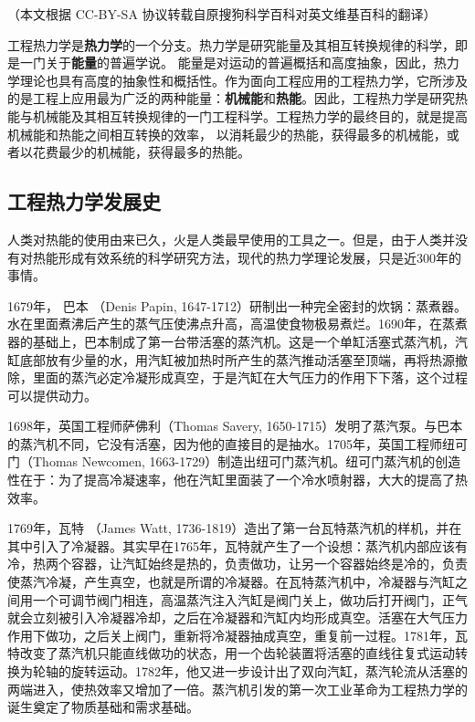 
（本文根据 CC-BY-SA 协议转载自原搜狗科学百科对英文维基百科的翻译）

工程热力学是\textbf{热力学}的一个分支。热力学是研究能量及其相互转换规律的科学，即是一门关于\textbf{能量}的普遍学说。 能量是对运动的普遍概括和高度抽象，因此，热力学理论也具有高度的抽象性和概括性。作为面向工程应用的工程热力学，它所涉及的是工程上应用最为广泛的两种能量：\textbf{机械能}和\textbf{热能}。因此，工程热力学是研究热能与机械能及其相互转换规律的一门工程科学。工程热力学的最终目的，就是提高机械能和热能之间相互转换的效率， 以消耗最少的热能，获得最多的机械能，或者以花费最少的机械能，获得最多的热能。

\subsection{工程热力学发展史}
人类对热能的使用由来已久，火是人类最早使用的工具之一。但是，由于人类并没有对热能形成有效系统的科学研究方法，现代的热力学理论发展，只是近300年的事情。

1679年， 巴本 （Denis Papin, 1647-1712）研制出一种完全密封的炊锅：蒸煮器。水在里面煮沸后产生的蒸气压使沸点升高，高温使食物极易煮烂。1690年，在蒸煮器的基础上，巴本制成了第一台带活塞的蒸汽机。这是一个单缸活塞式蒸汽机，汽缸底部放有少量的水，用汽缸被加热时所产生的蒸汽推动活塞至顶端，再将热源撤除，里面的蒸汽必定冷凝形成真空，于是汽缸在大气压力的作用下下落，这个过程可以提供动力。

1698年，英国工程师萨佛利（Thomas Savery, 1650-1715）发明了蒸汽泵。与巴本的蒸汽机不同，它没有活塞，因为他的直接目的是抽水。1705年，英国工程师纽可门（Thomas Newcomen, 1663-1729）制造出纽可门蒸汽机。纽可门蒸汽机的创造性在于：为了提高冷凝速率，他在汽缸里面装了一个冷水喷射器，大大的提高了热效率。

1769年，瓦特 （James Watt, 1736-1819）造出了第一台瓦特蒸汽机的样机，并在其中引入了冷凝器。其实早在1765年，瓦特就产生了一个设想：蒸汽机内部应该有冷，热两个容器，让汽缸始终是热的，负责做功，让另一个容器始终是冷的，负责使蒸汽冷凝，产生真空，也就是所谓的冷凝器。在瓦特蒸汽机中，冷凝器与汽缸之间用一个可调节阀门相连，高温蒸汽注入汽缸是阀门关上，做功后打开阀门，正气就会立刻被引入冷凝器冷却，之后在冷凝器和汽缸内均形成真空。活塞在大气压力作用下做功，之后关上阀门，重新将冷凝器抽成真空，重复前一过程。1781年，瓦特改变了蒸汽机只能直线做功的状态，用一个齿轮装置将活塞的直线往复式运动转换为轮轴的旋转运动。1782年，他又进一步设计出了双向汽缸，蒸汽轮流从活塞的两端进入，使热效率又增加了一倍。蒸汽机引发的第一次工业革命为工程热力学的诞生奠定了物质基础和需求基础。


